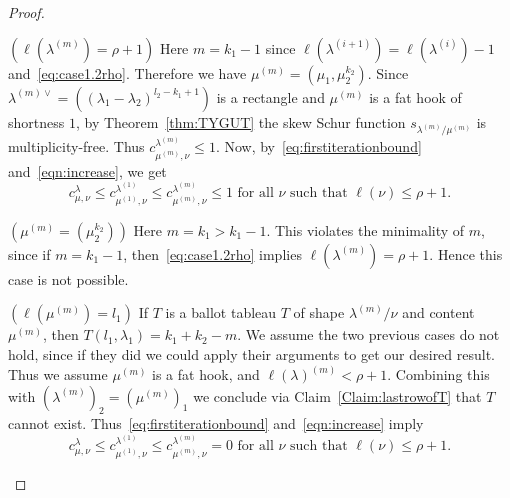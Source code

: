 \begin{proof}
\begin{Case}
\begin{figure}[htb]
\begin{subfigure}{0.48\textwidth}
 \caption[Case 1.3]{}
 \label{Case1b}
 \end{subfigure}
 \caption{}
 \label{Case1necessary} 
\end{figure}

\end{Case}

\begin{Case}
{ $(\ell(\lambda^{(m)}) = \rho+1)$} 
Here $m = k_1-1$ since $\ell(\lambda^{(i+1)}) = \ell(\lambda^{(i)})-1$ and~\eqref{eq:case1.2rho}. Therefore we have $\mu^{(m)} = (\mu_1,\mu_2^{k_2})$. Since $\lambda^{(m)\vee} = ((\lambda_1-\lambda_2)^{l_2-k_1+1})$ is a rectangle and $\mu^{(m)}$ is a fat hook of shortness $1$, by Theorem~\ref{thm:TYGUT} the skew Schur function $s_{\lambda^{(m)}/\mu^{(m)}}$ is multiplicity-free. Thus $c^{\lambda^{(m)}}_{\mu^{(m)},\nu} \leq 1$. Now, by~\eqref{eq:firstiterationbound} and~\eqref{eqn:increase}, we get
\[
c^{\lambda}_{\mu,\nu} \leq c^{\lambda^{(1)}}_{\mu^{(1)},\nu}\leq c^{\lambda^{(m)}}_{\mu^{(m)},\nu}\leq 1\text{ for all }\nu\text{ such that }\ell(\nu)\leq \rho+1.
\]
\end{Case}

\begin{Case}
{ $(\mu^{(m)} = (\mu_2^{k_2}))$} 
Here $m = k_1 > k_1-1$. This violates the minimality of $m$, since if $m = k_1-1$, then~\eqref{eq:case1.2rho} implies $\ell(\lambda^{(m)}) = \rho+1$. Hence this case is not possible.
\end{Case}

\begin{Case}
{ $(\ell(\mu^{(m)}) = l_1)$} 
If $T$ is a ballot tableau $T$ of shape $\lambda^{(m)}/\nu$ and content $\mu^{(m)}$, then $T(l_1,\lambda_1) = k_1+k_2-m$. We assume the two previous cases do not hold, since if they did we could apply their arguments to get our desired result. Thus we assume $\mu^{(m)}$ is a fat hook, and $\ell(\lambda)^{(m)} < \rho+1$. Combining this with $(\lambda^{(m)})_2 = (\mu^{(m)})_1$ we conclude via Claim~\ref{Claim:lastrowofT} that $T$ cannot exist. Thus~\eqref{eq:firstiterationbound} and~\eqref{eqn:increase} imply
\[
c^{\lambda}_{\mu,\nu} \leq c^{\lambda^{(1)}}_{\mu^{(1)},\nu}\leq c^{\lambda^{(m)}}_{\mu^{(m)},\nu}=0\text{ for all }\nu\text{ such that }\ell(\nu)\leq \rho+1.
\]


\end{Case}
\end{proof}
